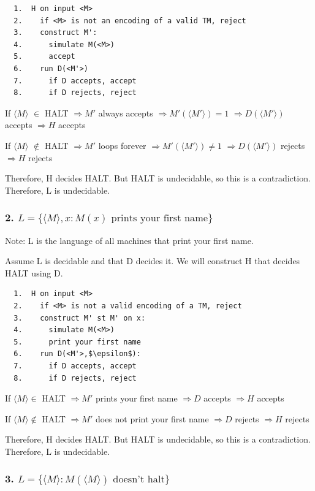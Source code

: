 \documentclass[letterpaper]{article}
\begin{document}
\begin{verbatim}
  1.  H on input <M>
  2.    if <M> is not an encoding of a valid TM, reject
  3.    construct M':
  4.      simulate M(<M>)
  5.      accept
  6.    run D(<M'>)
  7.      if D accepts, accept
  8.      if D rejects, reject
\end{verbatim}

If $\langle M\rangle$ $\in$ HALT
$\Rightarrow M'$ always accepts
$\Rightarrow M'(\langle M' \rangle) = 1$
$\Rightarrow D(\langle M' \rangle)$ accepts
$\Rightarrow H$ accepts

If $\langle M\rangle$ $\notin$ HALT
$\Rightarrow M'$ loops forever
$\Rightarrow M'(\langle M' \rangle) \ne 1$
$\Rightarrow D(\langle M' \rangle)$ rejects
$\Rightarrow H$ rejects

Therefore, H decides HALT. But HALT is undecidable,
so this is a contradiction. Therefore, L is undecidable.

\subsubsection*{2. $L = \{\langle M \rangle , x : M(x) \text{ prints your first name}\}$}

Note: L is the language of all machines that print your first name.

Assume L is decidable and that D decides it. We will construct H that decides HALT using D.

\begin{lstlisting}
  1.  H on input <M>
  2.    if <M> is not a valid encoding of a TM, reject
  3.    construct M' st M' on x:
  4.      simulate M(<M>)
  5.      print your first name
  6.    run D(<M'>,$\epsilon$):
  7.      if D accepts, accept
  8.      if D rejects, reject
\end{lstlisting}

If $\langle M \rangle \in$ HALT
$\Rightarrow M'$ prints your first name
$\Rightarrow D$ accepts
$\Rightarrow H$ accepts

If $\langle M \rangle \notin$ HALT
$\Rightarrow M'$ does not print your first name
$\Rightarrow D$ rejects
$\Rightarrow H$ rejects

Therefore, H decides HALT. But HALT is undecidable,
so this is a contradiction. Therefore, L is undecidable.

\subsubsection*{3. $L=\{\langle M \rangle : M (\langle M \rangle ) \text{ doesn't halt}\}$}
\end{document}
